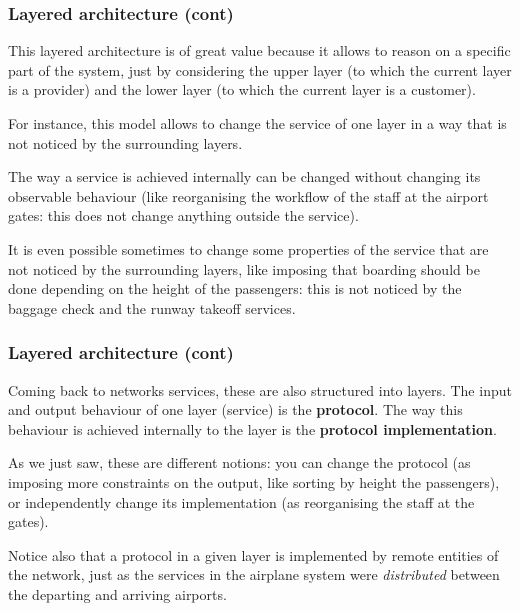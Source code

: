 %
\begin{frame}
\frametitle{Layered architecture (cont)}

This layered architecture is of great value because it allows to
reason on a specific part of the system, just by considering the upper
layer (to which the current layer is a provider) and the lower layer
(to which the current layer is a customer).

\bigskip

For instance, this model allows to change the service of one layer in
a way that is not noticed by the surrounding layers. 

\bigskip

The way a service is achieved internally can be changed without
changing its observable behaviour (like reorganising the workflow of
the staff at the airport gates: this does not change anything outside
the service).

\bigskip

It is even possible sometimes to change some properties of the service
that are not noticed by the surrounding layers, like imposing that
boarding should be done depending on the height of the passengers:
this is not noticed by the baggage check and the runway takeoff
services.

\end{frame}

%
\begin{frame}
\frametitle{Layered architecture (cont)}

Coming back to networks services, these are also structured into
layers. The input and output behaviour of one layer (service) is the
\textbf{protocol}. The way this behaviour is achieved internally to
the layer is the \textbf{protocol implementation}. 

\bigskip

As we just saw, these are different notions: you can change the
protocol (as imposing more constraints on the output, like sorting by
height the passengers), or independently change its implementation (as
reorganising the staff at the gates).

\bigskip

Notice also that a protocol in a given layer is implemented by remote
entities of the network, just as the services in the airplane system
were \emph{distributed} between the departing and arriving airports.

\end{frame}

